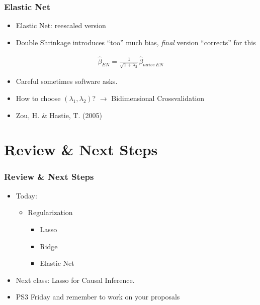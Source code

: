 \documentclass[
  shownotes,
  xcolor={svgnames},
  hyperref={colorlinks,citecolor=DarkBlue,linkcolor=DarkRed,urlcolor=DarkBlue}
  , aspectratio=169]{beamer}
\begin{document}
\begin{frame}[fragile]
\frametitle{Elastic Net}

\begin{itemize}
\item Elastic Net: reescaled version
\item Double Shrinkage introduces ``too'' much bias, {\it final} version ``corrects'' for this
\end{itemize}
\bigskip
\begin{align}
\hat{\beta}_{EN}= \frac{1}{\sqrt{1+\lambda_2}}\hat{\beta}_{naive\,EN}
\end{align}
\bigskip
\begin{itemize}
  \item Careful sometimes software asks.
  \item How to choose $(\lambda_1,\lambda_2)$? $\rightarrow$ Bidimensional Crossvalidation
  \item Zou, H. \& Hastie, T. (2005)
\end{itemize}

\end{frame}


 
\section{Review \& Next Steps}
\begin{frame}
\frametitle{Review \& Next Steps}
  
\begin{itemize} 
    \item Today:
    \medskip
    \begin{itemize} 
      \item Regularization
      \medskip
        \begin{itemize}  
            \item Lasso
            \medskip
            \item Ridge
            \medskip
            \item Elastic Net
        \end{itemize}
    \end{itemize}
    \bigskip  
  \item  Next class:  Lasso for Causal Inference.
  \bigskip  
  \item  PS3 Friday and remember to work on your proposals

\end{itemize}
\end{frame}
\end{document}
